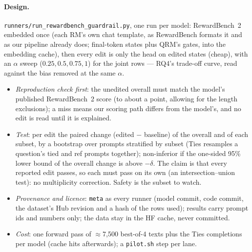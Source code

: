 \documentclass{article}
\begin{document}
\paragraph{Design.} \texttt{runners/run\_rewardbench\_guardrail.py}, one run per model: RewardBench~2 embedded once
(each RM's own chat template, as RewardBench formats it and as our pipeline already does; final-token states plus QRM's
gates, into the embedding cache), then every edit is only the head on edited states (cheap), with an $\alpha$ sweep
($0.25, 0.5, 0.75, 1$) for the joint rows --- RQ4's trade-off curve, read against the bias removed at the same $\alpha$.
\begin{itemize}
  \item \emph{Reproduction check first}: the unedited overall must match the model's published RewardBench~2 score
        (to about a point, allowing for the length exclusions); a miss means our scoring path differs from the
        model's, and no edit is read until it is explained.
  \item \emph{Test}: per edit the paired change (edited $-$ baseline) of the overall and of each subset, by a bootstrap
        over prompts stratified by subset (Ties resamples a question's tied and ref prompts together); non-inferior if
        the one-sided 95\% lower bound of the overall change is above $-\delta$. The claim is that every reported edit
        passes, so each must pass on its own (an intersection--union test): no multiplicity correction. Safety is the
        subset to watch.
  \item \emph{Provenance and licence}: \texttt{meta} as every runner (model commit, code commit, the dataset's Hub
        revision and a hash of the rows used); results carry prompt ids and numbers only; the data stay in the HF
        cache, never committed.
  \item \emph{Cost}: one forward pass of $\approx$7{,}500 best-of-4 texts plus the Ties completions per model (cache
        hits afterwards); a \texttt{pilot.sh} step per lane.
\end{itemize}
\end{document}
